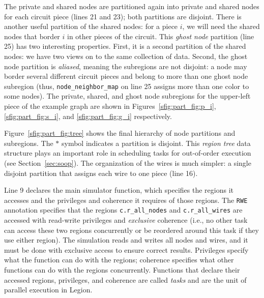 The private and shared nodes are partitioned again into private and shared nodes for each circuit piece (lines 21
and 23);  both partitions are disjoint.  There is another useful partition of the shared nodes:
for a piece $i$, we will need the shared nodes that border $i$ in other pieces of the circuit.
This {\em ghost node} partition (line 25) has two interesting properties.  First, it is a second partition of the shared nodes:
we have two views on to the same collection of data.  Second, the ghost node partition is {\em aliased}, meaning the subregions
are not disjoint: a node may border several different circuit pieces and belong to more than one ghost node subregion (thus, {\tt node\_neighbor\_map} on line 25 assigns more than one color to some nodes).
The private, shared, and ghost node subregions
for the upper-left piece of the example graph are shown in
Figures~\ref{sfig:part_fig:p_i}, \ref{sfig:part_fig:s_i}, and
\ref{sfig:part_fig:g_i} respectively.  

Figure~\ref{sfig:part_fig:tree} shows the final hierarchy of node
partitions and subregions. The $*$ symbol indicates a partition is disjoint. This
{\em region tree} data structure plays an important role in scheduling
tasks for out-of-order execution (see Section~\ref{sec:soop}).
The organization of the wires is much simpler: a single disjoint partition
that assigns each wire to one piece (line 16).

%
%
Line 9 declares the main simulator function, which specifies the regions it 
accesses and the privileges and coherence it requires of those regions.
The {\tt RWE} annotation specifies that
the regions {\tt c.r\_all\_nodes} and {\tt c.r\_all\_wires}
are accessed with read-write privileges and {\em exclusive} coherence (i.e., no other
task can access these two regions concurrently or be reordered around this
task if they use either region).  The simulation 
reads and writes all nodes and wires, and it must be done
with exclusive access to ensure correct results.  Privileges specify what
the function can do with the regions; coherence specifies what other
functions can do with the regions concurrently.  Functions that
declare their accessed regions, privileges, and coherence are called {\em tasks}
and are the unit of parallel execution in Legion.

